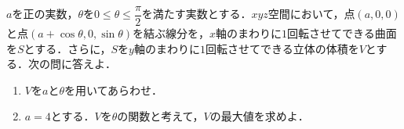 \documentclass[../../main.tex]{subfiles}
\begin{document}
$a$を正の実数，$\theta$を$0\le\theta\le\dfrac{\pi}{2}$を満たす実数とする．$xyz$空間において，点$(a,0,0)$と点$(a+\cos\theta,0,\sin\theta)$を結ぶ線分を，$x$軸のまわりに$1$回転させてできる曲面を$S$とする．さらに，$S$を$y$軸のまわりに$1$回転させてできる立体の体積を$V$とする．次の問に答えよ．
\begin{enumerate}
  \item $V$を$a$と$\theta$を用いてあらわせ．
  \item $a=4$とする．$V$を$\theta$の関数と考えて，$V$の最大値を求めよ．
\end{enumerate}
\end{document}
